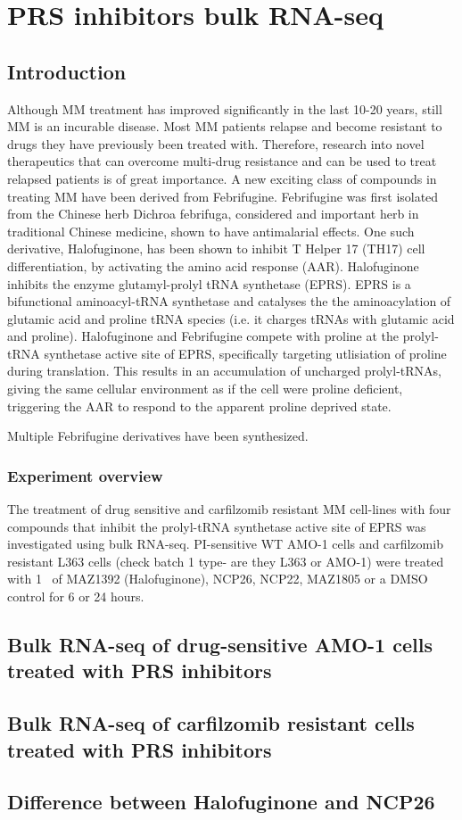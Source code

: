 \chapter{\label{ch:5-bulk}PRS inhibitors bulk RNA-seq}


\section{Introduction}
Although MM treatment has improved significantly in the last 10-20 years, still MM is an incurable disease.
Most MM patients relapse and become resistant to drugs they have previously been treated with.
Therefore, research into novel therapeutics that can overcome multi-drug resistance and can be used to treat relapsed patients is of great importance.
A new exciting class of compounds in treating MM have been derived from Febrifugine.
Febrifugine was first isolated from the Chinese herb Dichroa febrifuga, considered and important herb in traditional Chinese medicine, shown to have antimalarial effects.
One such derivative, Halofuginone, has been shown to inhibit T Helper 17 (TH17) cell differentiation, by activating the amino acid response (AAR)\cite{sundrud2009halofuginone}.
Halofuginone inhibits the enzyme glutamyl-prolyl tRNA synthetase (EPRS).
EPRS is a bifunctional aminoacyl-tRNA synthetase and catalyses the the aminoacylation of glutamic acid and proline tRNA species (i.e. it charges tRNAs with glutamic acid and proline).
Halofuginone and Febrifugine compete with proline at the prolyl-tRNA synthetase active site of EPRS, specifically targeting utlisiation of proline during translation\cite{keller2012halofuginone}.
This results in an accumulation of uncharged prolyl-tRNAs, giving the same cellular environment as if the cell were proline deficient, triggering the AAR to respond to the apparent proline deprived state.

Multiple Febrifugine derivatives have been synthesized.

\subsection{Experiment overview}
The treatment of drug sensitive and carfilzomib resistant MM cell-lines with four compounds that inhibit  the  prolyl-tRNA  synthetase  active  site  of  EPRS  was investigated using bulk RNA-seq.
PI-sensitive WT AMO-1 cells and carfilzomib resistant L363 cells (check batch 1 type- are they L363 or AMO-1) were treated with 1\si{\micro\Molar} of MAZ1392 (Halofuginone), NCP26, NCP22, MAZ1805 or a DMSO control for 6 or 24 hours.


\section{Bulk RNA-seq of drug-sensitive AMO-1 cells treated with PRS inhibitors}




\section{Bulk RNA-seq of carfilzomib resistant cells treated with PRS inhibitors}



\section{Difference between Halofuginone and NCP26}

